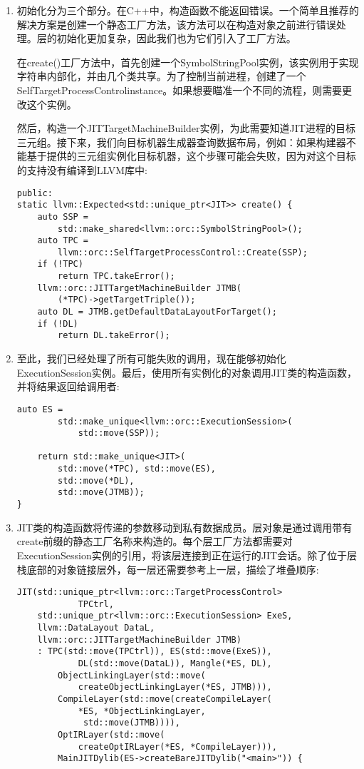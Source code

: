 \begin{enumerate}
\item 初始化分为三个部分。在C++中，构造函数不能返回错误。一个简单且推荐的解决方案是创建一个静态工厂方法，该方法可以在构造对象之前进行错误处理。层的初始化更加复杂，因此我们也为它们引入了工厂方法。\par
在create()工厂方法中，首先创建一个SymbolStringPool实例，该实例用于实现字符串内部化，并由几个类共享。为了控制当前进程，创建了一个SelfTargetProcessControlinstance。如果想要瞄准一个不同的流程，则需要更改这个实例。\par
然后，构造一个JITTargetMachineBuilder实例，为此需要知道JIT进程的目标三元组。接下来，我们向目标机器生成器查询数据布局，例如：如果构建器不能基于提供的三元组实例化目标机器，这个步骤可能会失败，因为对这个目标的支持没有编译到LLVM库中:
\begin{lstlisting}[caption={}]
public:
static llvm::Expected<std::unique_ptr<JIT>> create() {
	auto SSP =
		std::make_shared<llvm::orc::SymbolStringPool>();
	auto TPC =
		llvm::orc::SelfTargetProcessControl::Create(SSP);
	if (!TPC)
		return TPC.takeError();
	llvm::orc::JITTargetMachineBuilder JTMB(
		(*TPC)->getTargetTriple());
	auto DL = JTMB.getDefaultDataLayoutForTarget();
	if (!DL)
		return DL.takeError();
\end{lstlisting}

\item 至此，我们已经处理了所有可能失败的调用，现在能够初始化ExecutionSession实例。最后，使用所有实例化的对象调用JIT类的构造函数，并将结果返回给调用者:
\begin{lstlisting}[caption={}]
	auto ES =
		std::make_unique<llvm::orc::ExecutionSession>(
			std::move(SSP));
	
	return std::make_unique<JIT>(
		std::move(*TPC), std::move(ES),
		std::move(*DL),
		std::move(JTMB));
}
\end{lstlisting}

\item JIT类的构造函数将传递的参数移动到私有数据成员。层对象是通过调用带有create前缀的静态工厂名称来构造的。每个层工厂方法都需要对ExecutionSession实例的引用，将该层连接到正在运行的JIT会话。除了位于层栈底部的对象链接层外，每一层还需要参考上一层，描绘了堆叠顺序:
\begin{lstlisting}[caption={}]
	JIT(std::unique_ptr<llvm::orc::TargetProcessControl>
			TPCtrl,
	std::unique_ptr<llvm::orc::ExecutionSession> ExeS,
	llvm::DataLayout DataL,
	llvm::orc::JITTargetMachineBuilder JTMB)
	: TPC(std::move(TPCtrl)), ES(std::move(ExeS)),
			DL(std::move(DataL)), Mangle(*ES, DL),
		ObjectLinkingLayer(std::move(
			createObjectLinkingLayer(*ES, JTMB))),
		CompileLayer(std::move(createCompileLayer(
			*ES, *ObjectLinkingLayer,
			 std::move(JTMB)))),
		OptIRLayer(std::move(
			createOptIRLayer(*ES, *CompileLayer))),
		MainJITDylib(ES->createBareJITDylib("<main>")) {
\end{lstlisting}


\end{enumerate}
